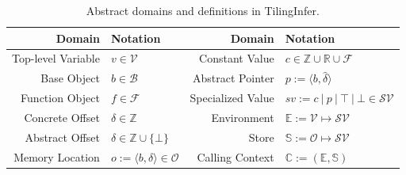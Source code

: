 \documentclass[manuscript,screen,review]{acmart}
\theoremstyle{indenteditalic}
\providecommand{\DIFaddbegin}{} %
\providecommand{\DIFaddend}{} %
\providecommand{\DIFdelend}{} %
\begin{document}
\DIFdelend \DIFaddbegin \begin{table}[htbp]
	\centering
	\small
	\renewcommand{\arraystretch}{1.05}
	\setlength{\tabcolsep}{5pt}
	\caption{Abstract domains and definitions in TilingInfer.}
	\label{fig:abstract-domain}
	\begin{tabular}{rl @{\hskip 0.8cm} rl}
		\toprule
		\textbf{Domain}    & \textbf{Notation}                                   & \textbf{Domain} & \textbf{Notation} \\
		\midrule
		Top-level Variable & $v \in \mathcal{V}$                                 &
		Constant Value     & $c \in \mathbb{Z} \cup \mathbb{R} \cup \mathcal{F}$                                       \\

		Base Object        & $b \in \mathcal{B}$                                 &
		Abstract Pointer   & $p := \langle b, \hat{\delta} \rangle$                                                    \\

		Function Object    & $f \in \mathcal{F}$                                 &
		Specialized Value  & $sv := c~|~p~|~\top~|~\bot \in \mathcal{SV}$                                              \\

		Concrete Offset    & $\delta \in \mathbb{Z}$                             &
		Environment        & $\mathbb{E} := \mathcal{V} \mapsto \mathcal{SV}$                                          \\

		Abstract Offset    & $\hat{\delta} \in \mathbb{Z} \cup \{ \bot \}$       &
		Store              & $\mathbb{S} := \mathcal{O} \mapsto \mathcal{SV}$                                          \\

		Memory Location    & $o := \langle b, \delta \rangle \in \mathcal{O}$    &
		Calling Context    & $\mathbb{C} := (\mathbb{E}, \mathbb{S})$                                                  \\
			\bottomrule
		\end{tabular}
\end{table}
\DIFaddend 
\end{document}
